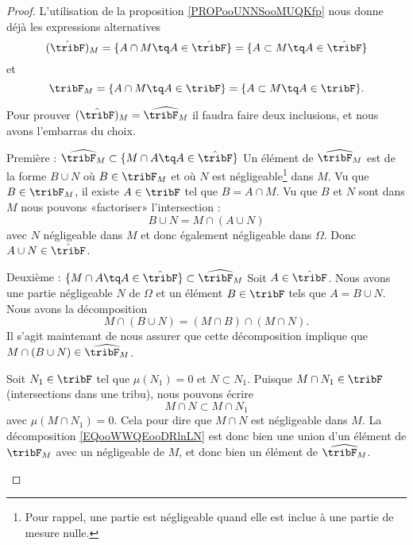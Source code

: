 \begin{proof}
    L'utilisation de la proposition \ref{PROPooUNNSooMUQKfp} nous donne déjà les expressions alternatives
    \begin{equation}
        (\hat\tribF)_M=\{ A\cap M\tq A\in\hat\tribF \}=\{ A\subset M\tq A\in\hat\tribF \}
    \end{equation}
    et
    \begin{equation}
        \tribF_M=\{ A\cap M\tq A\in\tribF \}=\{ A\subset M\tq A\in\tribF \}.
    \end{equation}

    Pour prouver \( (\hat\tribF)_M=\widehat{\tribF_M}\) il faudra faire deux inclusions, et nous avons l'embarras du choix.
    \begin{subproof}
    \item[Première : \( \widehat{\tribF_M}\subset\{ M\cap A\tq A\in\hat\tribF \}\)]
        Un élément de \( \widehat{\tribF_M}\) est de la forme \( B\cup N\) où \( B\in \tribF_M\) et où \( N\) est négligeable\footnote{Pour rappel, une partie est négligeable quand elle est inclue à une partie de mesure nulle.} dans \( M\). Vu que \( B\in\tribF_M\), il existe \( A\in\tribF\) tel que \( B=A\cap M\). Vu que \( B\) et \( N\) sont dans \( M\) nous pouvons «factoriser» l'intersection :
        \begin{equation}
            B\cup N=M\cap (A\cup N)
        \end{equation}
        avec \( N\) négligeable dans \( M\) et donc également négligeable dans \( \Omega\). Donc \( A\cup N\in \hat\tribF\).

    \item[Deuxième : \( \{ M\cap A\tq A\in\hat\tribF \}\subset \widehat{\tribF_M}\)]
        Soit \( A\in\hat\tribF\). Nous avons une partie négligeable \( N\) de \( \Omega\) et un élément \( B\in \tribF\) tels que \( A=B\cup N\). Nous avons la décomposition
        \begin{equation}        \label{EQooWWQEooDRlnLN}
            M\cap(B\cup N)=(M\cap B)\cap(M\cap N).
        \end{equation}
        Il s'agit maintenant de nous assurer que cette décomposition implique que \( M\cap(B\cup N)\in \widehat{\tribF_M}\).

        Soit \( N_1\in \tribF\) tel que \( \mu(N_1)=0\) et \( N\subset N_1\). Puisque \( M\cap N_1\in \tribF\) (intersections dans une tribu), nous pouvons écrire
        \begin{equation}
            M\cap N\subset M\cap N_1
        \end{equation}
        avec \( \mu(M\cap N_1)=0\). Cela pour dire que \( M\cap N\) est négligeable dans \( M\). La décomposition \eqref{EQooWWQEooDRlnLN} est donc bien une union d'un élément de \( \tribF_M\) avec un négligeable de \( M\), et donc bien un élément de \( \widehat{\tribF_M}\).
    \end{subproof}
\end{proof}

